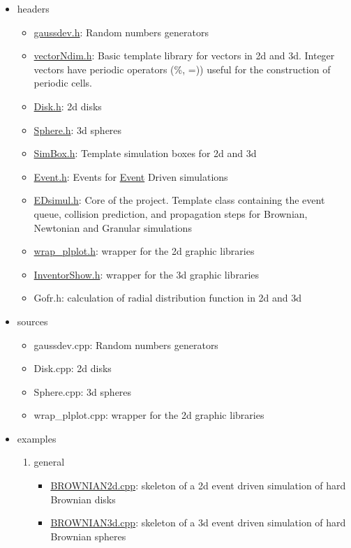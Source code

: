 \begin{itemize}
\item headers\begin{itemize}
\item \hyperlink{gaussdev_8h}{gaussdev.h}: Random numbers generators\item \hyperlink{vectorNdim_8h}{vectorNdim.h}: Basic template library for vectors in 2d and 3d. Integer vectors have periodic operators (\%, =)) useful for the construction of periodic cells.\item \hyperlink{Disk_8h}{Disk.h}: 2d disks\item \hyperlink{Sphere_8h}{Sphere.h}: 3d spheres\item \hyperlink{SimBox_8h}{SimBox.h}: Template simulation boxes for 2d and 3d\item \hyperlink{Event_8h}{Event.h}: Events for \hyperlink{classEvent}{Event} Driven simulations\item \hyperlink{EDsimul_8h}{EDsimul.h}: Core of the project. Template class containing the event queue, collision prediction, and propagation steps for Brownian, Newtonian and Granular simulations\item \hyperlink{wrap__plplot_8h}{wrap\_\-plplot.h}: wrapper for the 2d graphic libraries\item \hyperlink{InventorShow_8h}{InventorShow.h}: wrapper for the 3d graphic libraries\item Gofr.h: calculation of radial distribution function in 2d and 3d\end{itemize}
\item sources\begin{itemize}
\item gaussdev.cpp: Random numbers generators\item Disk.cpp: 2d disks\item Sphere.cpp: 3d spheres\item wrap\_\-plplot.cpp: wrapper for the 2d graphic libraries\end{itemize}
\item examples\begin{enumerate}
\item general\begin{itemize}
\item \hyperlink{BROWNIAN2d_8cpp}{BROWNIAN2d.cpp}: skeleton of a 2d event driven simulation of hard Brownian disks\item \hyperlink{BROWNIAN3d_8cpp}{BROWNIAN3d.cpp}: skeleton of a 3d event driven simulation of hard Brownian spheres\end{itemize}

\end{enumerate}
\end{itemize}
